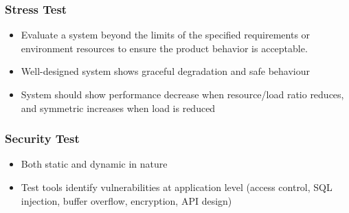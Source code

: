 \documentclass{article}
\begin{document}
\subsubsection{Stress Test}
\begin{itemize}
    \item Evaluate a system beyond the limits of  the specified requirements or environment resources to ensure the product behavior is acceptable.
    
    \item Well-designed system shows graceful degradation and safe behaviour
    
    \item System should show performance decrease when resource/load ratio reduces, and symmetric increases when load is reduced
\end{itemize}

\subsubsection{Security Test}
\begin{itemize}
    \item Both static and dynamic in nature
    
    \item Test tools identify vulnerabilities at  application level (access control, SQL injection, buffer overflow, encryption, API design)

\end{itemize}
\end{document}
